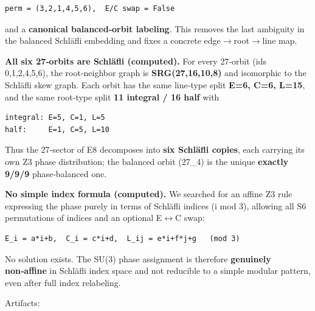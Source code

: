 \documentclass[11pt]{article}
\begin{document}
\begin{verbatim}
perm = (3,2,1,4,5,6),  E/C swap = False
\end{verbatim}

and a \textbf{canonical balanced‑orbit labeling}. This removes the last
ambiguity in the balanced Schläfli embedding and fixes a concrete
edge\ensuremath{\rightarrow}root\ensuremath{\rightarrow}line map.

\textbf{All six 27‑orbits are Schläfli (computed).} For every 27‑orbit
(ids 0,1,2,4,5,6), the root‑neighbor graph is \textbf{SRG(27,16,10,8)}
and isomorphic to the Schläfli skew graph. Each orbit has the same
line‑type split \textbf{E=6, C=6, L=15}, and the same root‑type split
\textbf{11 integral / 16 half} with

\begin{verbatim}
integral: E=5, C=1, L=5
half:     E=1, C=5, L=10
\end{verbatim}

Thus the 27‑sector of E8 decomposes into \textbf{six Schläfli copies},
each carrying its own Z3 phase distribution; the balanced orbit (27\_4)
is the unique \textbf{exactly 9/9/9} phase‑balanced one.

\textbf{No simple index formula (computed).} We searched for an affine
Z3 rule expressing the phase purely in terms of Schläfli indices (i mod
3), allowing all S6 permutations of indices and an optional
E\ensuremath{\leftrightarrow}C swap:

\begin{verbatim}
E_i = a*i+b,  C_i = c*i+d,  L_ij = e*i+f*j+g   (mod 3)
\end{verbatim}

No solution exists. The SU(3) phase assignment is therefore
\textbf{genuinely non‑affine} in Schläfli index space and not reducible
to a simple modular pattern, even after full index relabeling.

Artifacts:
\end{document}
